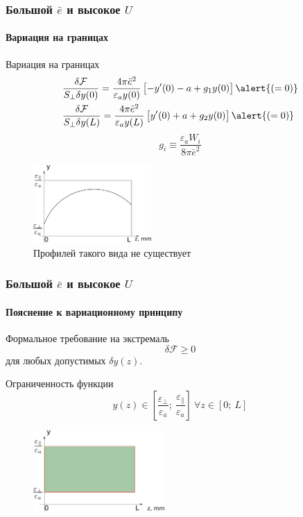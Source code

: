 \documentclass[utf8,secheader]{beamer}
\newcommand{\FF}{\mathcal{F}}
\begin{document}
\begin{frame}
\frametitle{Большой $\bar{e}$ и высокое $U$}
\framesubtitle{Вариация на границах}
\small
\begin{block}{Вариация на границах}
\vspace{-0.5cm}
\begin{align}
&\frac{\delta \FF}{S_\bot\delta y(0)} = \frac{4\pi\bar{e}^2}{\varepsilon_a y(0)}\left[ -y'(0) - a + g_1 y(0) \right] \alert{(=0)}\\
&\frac{\delta \FF}{S_\bot\delta y(L)} = \frac{4\pi\bar{e}^2}{\varepsilon_a y(L)}\left[ y'(0) + a + g_2 y(0) \right] \alert{(=0)}
\end{align}
\begin{equation}
g_i \equiv \frac{\varepsilon_a W_i}{8\pi\bar{e}^2}
\end{equation}
\end{block}
\begin{figure}
\includegraphics[width = 0.4\textwidth]{Profile_basic_impossible.png}
\vspace{-0.2cm}
\caption{Профилей такого вида не существует}
\end{figure}
\end{frame}



\begin{frame}
\frametitle{Большой $\bar{e}$ и высокое $U$}
\framesubtitle{Пояснение к вариационному принципу}
\begin{block}{Формальное требование на экстремаль}
$$
\delta \FF \geq 0
$$
для любых \alert{допустимых} $\delta y(z)$.
\end{block}
\begin{block}{Ограниченность функции}
$$
y(z) \in \left[ \frac{\varepsilon_\bot}{\varepsilon_a};\ \frac{\varepsilon_\parallel}{\varepsilon_a} \right]\ \forall z \in [0;\ L]
$$
\end{block}
\begin{figure}[ht]
\centering
\includegraphics[width=5cm]{Sample_rectangle.png}
\end{figure}
\end{frame}
\end{document}
